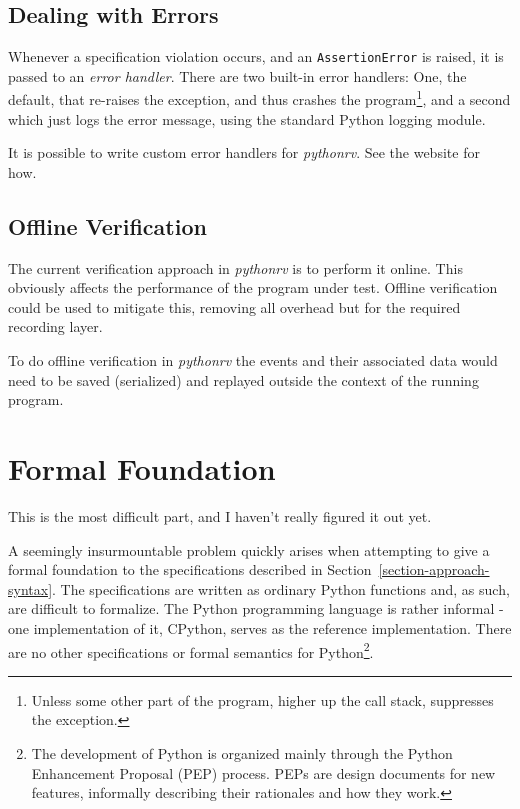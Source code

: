 \documentclass[a4paper,11pt]{kth-mag}
\begin{document}
\subsection{Dealing with Errors}

Whenever a specification violation occurs, and an \texttt{AssertionError} is
raised, it is passed to an \textit{error handler}. There are two built-in error
handlers: One, the default, that re-raises the exception, and thus crashes the
program\footnote{Unless some other part of the program, higher up the call
stack, suppresses the exception.}, and a second which just logs the error
message, using the standard Python logging module.

It is possible to write custom error handlers for \textit{pythonrv}. See the
website for how.


\subsection{Offline Verification}

The current verification approach in \textit{pythonrv} is to perform it online.
This obviously affects the performance of the program under test. Offline
verification could be used to mitigate this, removing all overhead but for the
required recording layer.

To do offline verification in \textit{pythonrv} the events and their associated
data would need to be saved (serialized) and replayed outside the context of
the running program.



\section{Formal Foundation} \label{section-approach-formal-foundation}

This is the most difficult part, and I haven't really figured it out yet.

A seemingly insurmountable problem quickly arises when attempting to give a
formal foundation to the specifications described in
Section~\ref{section-approach-syntax}. The specifications are written as
ordinary Python functions and, as such, are difficult to formalize. The Python
programming language is rather informal - one implementation of it, CPython,
serves as the reference implementation. There are no other specifications or
formal semantics for Python\footnote{The development of Python is organized
  mainly through the Python Enhancement Proposal (PEP) process. PEPs are design
documents for new features, informally describing their rationales and how they
work.}.
\end{document}
